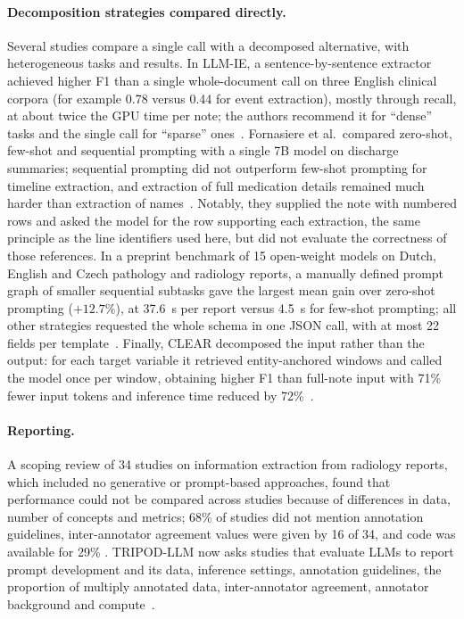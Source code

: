 \paragraph{Decomposition strategies compared directly.} Several studies compare a single call with a decomposed
alternative, with heterogeneous tasks and results. In LLM-IE, a sentence-by-sentence extractor achieved higher
F1 than a single whole-document call on three English clinical corpora (for example 0.78 versus 0.44 for event
extraction), mostly through recall, at about twice the GPU time per note; the authors recommend it for ``dense''
tasks and the single call for ``sparse'' ones~\cite{llmie2025}. Fornasiere et al.\ compared zero-shot, few-shot
and sequential prompting with a single 7B model on discharge summaries; sequential prompting did not outperform
few-shot prompting for timeline extraction, and extraction of full medication details remained much harder
than extraction of names~\cite{fornasiere2024medical}. Notably, they supplied the note with numbered rows and
asked the model for the row supporting each extraction, the same principle as the line identifiers used here,
but did not evaluate the correctness of those references. In a preprint benchmark of 15 open-weight models on
Dutch, English and Czech pathology and radiology reports, a manually defined prompt graph of smaller sequential
subtasks gave the largest mean gain over zero-shot prompting ($+12.7\%$), at 37.6~s per report versus 4.5~s for
few-shot prompting; all other strategies requested the whole schema in one JSON call, with at most 22 fields per
template~\cite{spaanderman2025structured}. Finally, CLEAR decomposed the input rather than the output: for each
target variable it retrieved entity-anchored windows and called the model once per window, obtaining higher F1
than full-note input with 71\% fewer input tokens and inference time reduced by 72\%~\cite{clinicalentityretrieval2024}.

\paragraph{Reporting.} A scoping review of 34 studies on information extraction from radiology reports, which
included no generative or prompt-based approaches, found that performance could not be compared across studies
because of differences in data, number of concepts and metrics; 68\% of studies did not mention annotation
guidelines, inter-annotator agreement values were given by 16 of 34, and code was available for 29\%
\cite{scoping2024radiology}. TRIPOD-LLM now asks studies that evaluate LLMs to report prompt development and
its data, inference settings, annotation guidelines, the proportion of multiply annotated data,
inter-annotator agreement, annotator background and compute~\cite{gallifant2025tripodllm}.

